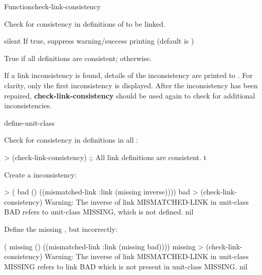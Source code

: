 \documentclass[10pt,twoside,english,pdftex]{article}
\begin{document}
\begin{functiondoc}{Function}{check-link-consistency}{
     \returns{} }
%

\fnsyntax

\fnpurpose Check for consistency in  definitions of
 to be linked.

\fnpackage {}

\fnmodule {}

\fnargs
\begin{args}{silent}
\arg[silent] If true, suppress warning/success printing (default is \nil) 
\end{args}

\fnreturns True if all  definitions are consistent; \nil{}
otherwise. 

\fndescription If a link inconsistency is found, details of the
inconsistency are printed to .  For clarity,
only the first inconsistency is displayed.  After the inconsistency
has been repaired, \textbf{check-link-consistency} should be used
again to check for additional inconsistencies.

\begin{alsos}{define-unit-class}
\end{alsos}

\fnexamples
Check for consistency in  definitions in all
: 
\begin{example}
> (check-link-consistency)
;; All link definitions are consistent.
t
\end{example}

%
Create a  inconsistency:
\begin{example}
> ( bad () 
     ((mismatched-link :link (missing inverse))))
bad
> (check-link-consistency)
Warning: The inverse of link MISMATCHED-LINK in unit-class BAD refers
         to unit-class MISSING, which is not defined.
nil
\end{example}

Define the missing , but incorrectly:
\begin{example}
( missing () ((mismatched-link :link (missing bad))))
missing
> (check-link-consistency)
Warning: The inverse of link MISMATCHED-LINK in unit-class MISSING
         refers to link BAD which is not present in unit-class MISSING.
nil
\end{example}


\end{functiondoc}
\end{document}
